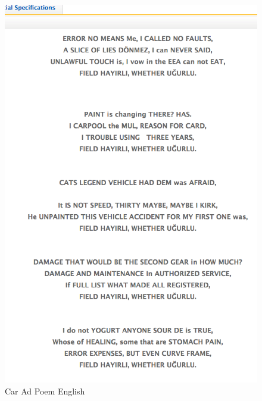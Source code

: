 \documentclass[10pt,letterpaper,bibliography=totoc]{scrartcl}
\begin{document}
\begin{figure}[h!]
\centering
\label{fig:poem_english}
\includegraphics[scale=.5]{poem_english.png}
\caption{Car Ad Poem English}
\end{figure}
\end{document}
